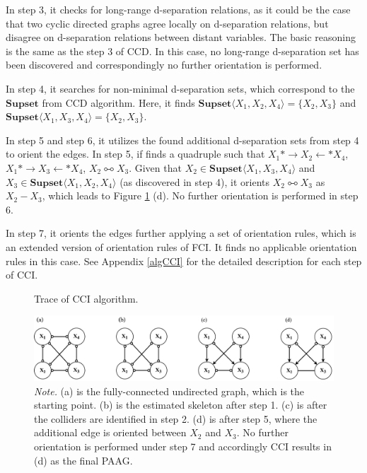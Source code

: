 \documentclass[11pt]{article}
\theoremstyle{definition}
\begin{document}
In step 3, it checks for long-range d-separation relations, as it could be the case that two cyclic directed graphs agree locally on d-separation relations, but disagree on d-separation relations between distant variables. The basic reasoning is the same as the step 3 of CCD. In this case, no long-range d-separation set has been discovered and correspondingly no further orientation is performed.

In step 4, it searches for non-minimal d-separation sets, which correspond to the $\mathbf{Supset}$ from CCD algorithm. Here, it finds $\mathbf{Supset}\langle X_1, X_2, X_4 \rangle = \{X_2, X_3\}$ and $\mathbf{Supset}\langle X_1, X_3, X_4 \rangle = \{X_2, X_3\}$.

In step 5 and step 6, it utilizes the found additional d-separation sets from step 4 to orient the edges. In step 5, if finds a quadruple such that $X_1 *\rightarrow X_2 \leftarrow* X_4$, $X_1 *\rightarrow X_3 \leftarrow* X_4$, $X_2 \multimapboth X_3$. Given that $X_2 \in \mathbf{Supset} \langle X_1, X_3, X_4 \rangle$ and $X_3 \in \mathbf{Supset} \langle X_1, X_2, X_4 \rangle$ (as discovered in step 4), it orients $X_2 \multimapboth X_3$ as $X_2 - X_3$, which leads to Figure \ref{fig:10} (d). No further orientation is performed in step 6.

In step 7, it orients the edges further applying a set of orientation rules, which is an extended version of orientation rules of FCI. It finds no applicable orientation rules in this case. See Appendix \ref{algCCI} for the detailed description for each step of CCI.



\begin{figure}[H]
    \centering
        \caption{Trace of CCI algorithm.}
        \vspace{1mm}
        \includegraphics[width=1.0\textwidth]{figures/CCItrace.png}
        \vspace{1mm}
        \caption*{\textit{Note.} (a) is the fully-connected undirected graph, which is the starting point. (b) is the estimated skeleton after step 1. (c) is after the colliders are identified in step 2. (d) is after step 5, where the additional edge is oriented between $X_2$ and $X_3$. No further orientation is performed under step 7 and accordingly CCI results in (d) as the final PAAG.}
    \label{fig:10}
\end{figure}
\end{document}
